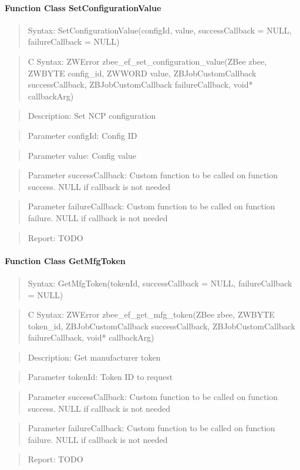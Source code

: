 \paragraph{Function Class SetConfigurationValue}
\begin{quote}Syntax: SetConfigurationValue(configId, value, successCallback = NULL, failureCallback = NULL)\end{quote}
\begin{quote}C Syntax: ZWError zbee\_ef\_set\_configuration\_value(ZBee zbee, ZWBYTE config\_id, ZWWORD value, ZBJobCustomCallback successCallback, ZBJobCustomCallback failureCallback, void* callbackArg)\end{quote}
\begin{quote}Description: Set NCP configuration\end{quote}
\begin{quote}Parameter configId: Config ID\end{quote}
\begin{quote}Parameter value: Config value\end{quote}
\begin{quote}Parameter successCallback: Custom function to be called on function success. NULL if callback is not needed\end{quote}
\begin{quote}Parameter failureCallback: Custom function to be called on function failure. NULL if callback is not needed\end{quote}
\begin{quote}Report: TODO\end{quote}

\paragraph{Function Class GetMfgToken}
\begin{quote}Syntax: GetMfgToken(tokenId, successCallback = NULL, failureCallback = NULL)\end{quote}
\begin{quote}C Syntax: ZWError zbee\_ef\_get\_mfg\_token(ZBee zbee, ZWBYTE token\_id, ZBJobCustomCallback successCallback, ZBJobCustomCallback failureCallback, void* callbackArg)\end{quote}
\begin{quote}Description: Get manufacturer token\end{quote}
\begin{quote}Parameter tokenId: Token ID to request\end{quote}
\begin{quote}Parameter successCallback: Custom function to be called on function success. NULL if callback is not needed\end{quote}
\begin{quote}Parameter failureCallback: Custom function to be called on function failure. NULL if callback is not needed\end{quote}
\begin{quote}Report: TODO\end{quote}

